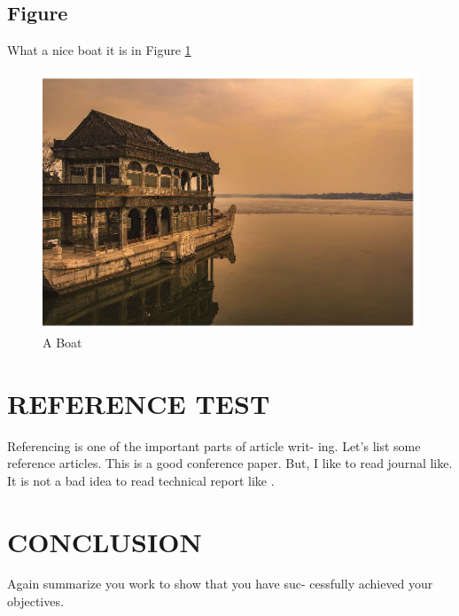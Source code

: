 \documentclass[conference]{sig-alternate}
\begin{document}
\subsection{Figure}
What a nice boat it is in Figure \ref{fig:boat}

\begin{figure}[h!]
	\includegraphics[width=\linewidth]{boat.jpg}
	\caption{A Boat}
	\label{fig:boat}
\end{figure}
\section{REFERENCE TEST}
Referencing is one of the important parts of article writ-
ing. Let's list some reference articles. This is\cite{Blum2005} a good
conference paper. But, I like to read journal like\cite{Samarati:2001:PRI:627337.628183}. It is
not a bad idea to read technical report like \cite{Li2011}.
\section{CONCLUSION}
Again summarize you work to show that you have suc-
cessfully achieved your objectives.



\end{document}

